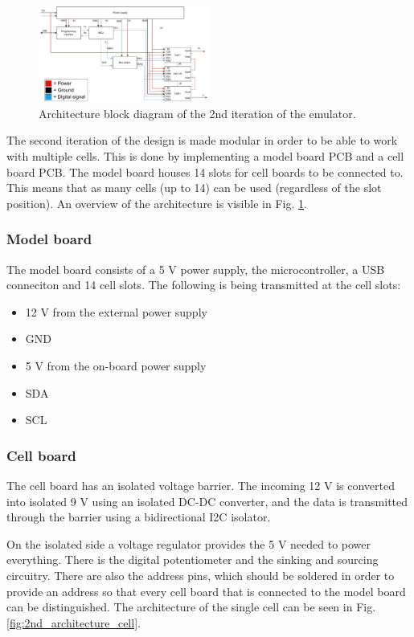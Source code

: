 \begin{figure}[h]
    \centering
    \includegraphics[width=0.5\textwidth]{architecture_2nd_iteration.pdf}
    \caption{Architecture block diagram of the 2nd iteration of the emulator.}
    \label{fig:2nd_architecture}
\end{figure}

The second iteration of the design is made modular in order to be able to work
 with multiple cells. This is done by implementing a model board
PCB and a cell board PCB. The model board houses 14 slots for cell boards to be 
connected to. This means that as many cells (up to 14) can be used (regardless 
of the slot position). An overview of the architecture is visible in 
Fig. \ref{fig:2nd_architecture}.

    \subsubsection{Model board}
    The model board consists of a 5 V power supply, the microcontroller, a USB 
    conneciton and 14 cell slots. The following is being transmitted at the
    cell slots:

    \begin{itemize}
        \item 12 V from the external power supply
        \item GND
        \item 5 V from the on-board power supply
        \item SDA
        \item SCL
    \end{itemize}

    \subsubsection{Cell board}
    The cell board has an isolated voltage barrier. The incoming 12 V is 
    converted into isolated 9 V using an isolated DC-DC converter, and the data is
    transmitted through the barrier using a bidirectional I2C isolator.

    On the isolated side a voltage regulator provides 
    the 5 V needed to power everything. There is the digital potentiometer
    and the sinking and sourcing circuitry. There are also the address pins, which
    should be soldered in order to provide an address so that every cell board that 
    is connected to the model board can be distinguished.
    The architecture of the single cell can be seen in Fig. 
    \ref{fig:2nd_architecture_cell}.

